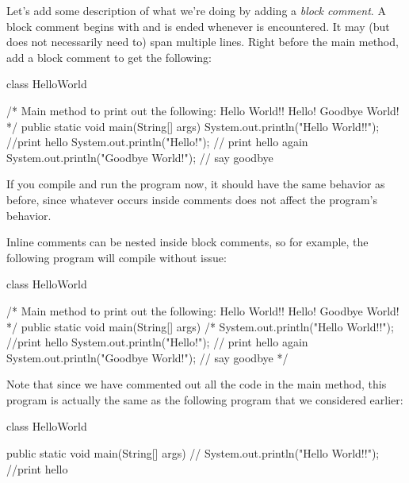 Let's add some description of what we're doing by adding a \emph{block comment}.
A block comment begins with \ic{/*} and is ended whenever \ic{*/} is encountered.
It may (but does not necessarily need to) span multiple lines.
Right before the main method, add a block comment to get the following:
\begin{code}
class HelloWorld {

    /* Main method to print out the following:
         Hello World!!
         Hello!
         Goodbye World!
    */
    public static void main(String[] args) {
        System.out.println("Hello World!!"); //print hello
        System.out.println("Hello!"); // print hello again
        System.out.println("Goodbye World!"); // say goodbye
    }

}
\end{code}
If you compile and run the program now, it should have the same behavior as before, since whatever occurs
inside comments does not affect the program's behavior.

Inline comments can be nested inside block comments, so for example, the following program
will compile without issue:
\begin{code}
class HelloWorld {

    /* Main method to print out the following:
         Hello World!!
         Hello!
         Goodbye World!
    */
    public static void main(String[] args) {
        /*
        System.out.println("Hello World!!"); //print hello
        System.out.println("Hello!"); // print hello again
        System.out.println("Goodbye World!"); // say goodbye
        */
    }

}
\end{code}
Note that since we have commented out all the code in the main method,
this program is actually the same as the following program that we considered earlier:
\begin{code}
class HelloWorld {

    public static void main(String[] args) {
//        System.out.println("Hello World!!"); //print hello
    }

}
\end{code}

